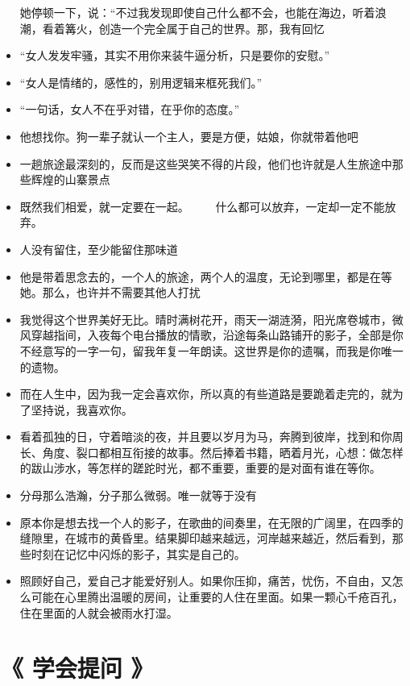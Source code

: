 \documentclass[UTF8,a4paper,8pt]{ctexart}
\begin{document}
\begin{itemize}
 	她停顿一下，说：“不过我发现即使自己什么都不会，也能在海边，听着浪潮，看着篝火，创造一个完全属于自己的世界。那，我有回忆
 	\item “女人发发牢骚，其实不用你来装牛逼分析，只是要你的安慰。”
 	\item “女人是情绪的，感性的，别用逻辑来框死我们。”
 	\item “一句话，女人不在乎对错，在乎你的态度。”
 	\item 他想找你。狗一辈子就认一个主人，要是方便，姑娘，你就带着他吧
 	\item 一趟旅途最深刻的，反而是这些哭笑不得的片段，他们也许就是人生旅途中那些辉煌的山寨景点
 	\item 既然我们相爱，就一定要在一起。 　　什么都可以放弃，一定却一定不能放弃。
 	\item 人没有留住，至少能留住那味道
 	\item 他是带着思念去的，一个人的旅途，两个人的温度，无论到哪里，都是在等她。那么，也许并不需要其他人打扰
 	\item 我觉得这个世界美好无比。晴时满树花开，雨天一湖涟漪，阳光席卷城市，微风穿越指间，入夜每个电台播放的情歌，沿途每条山路铺开的影子，全部是你不经意写的一字一句，留我年复一年朗读。这世界是你的遗嘱，而我是你唯一的遗物。
 	\item 而在人生中，因为我一定会喜欢你，所以真的有些道路是要跪着走完的，就为了坚持说，我喜欢你。
 	\item 看着孤独的日，守着暗淡的夜，并且要以岁月为马，奔腾到彼岸，找到和你周长、角度、裂口都相互衔接的故事。然后捧着书籍，晒着月光，心想：做怎样的跋山涉水，等怎样的蹉跎时光，都不重要，重要的是对面有谁在等你。
 	\item 分母那么浩瀚，分子那么微弱。唯一就等于没有
 	\item 原本你是想去找一个人的影子，在歌曲的间奏里，在无限的广阔里，在四季的缝隙里，在城市的黄昏里。结果脚印越来越远，河岸越来越近，然后看到，那些时刻在记忆中闪烁的影子，其实是自己的。
 	\item 照顾好自己，爱自己才能爱好别人。如果你压抑，痛苦，忧伤，不自由，又怎么可能在心里腾出温暖的房间，让重要的人住在里面。如果一颗心千疮百孔，住在里面的人就会被雨水打湿。
 \end{itemize}			
 \newpage			
 \section{《 学会提问 》 }  
 
 \newpage			
\end{document}
